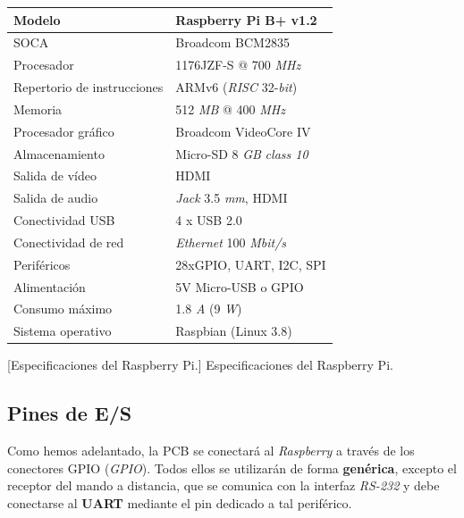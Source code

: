 \begin{center}
	\begin{tabular}{|l|l|}
		\hline Modelo & Raspberry Pi B+ v1.2 \\
		\hline \acrshort{SOCA} & Broadcom BCM2835 \\
		\hline Procesador &  1176JZF-S @ 700 \textit{MHz} \\
		\hline Repertorio de instrucciones & ARMv6 (\textit{RISC} 32-\textit{bit}) \\
		\hline Memoria & 512 \textit{MB} @ 400 \textit{MHz} \\
		\hline Procesador gráfico & Broadcom VideoCore IV \\ 		
		\hline Almacenamiento & Micro-\acrshort{SD} 8 \textit{GB} \textit{class 10} \\
		\hline Salida de vídeo & \acrshort{HDMI} \\
		\hline Salida de audio & \textit{Jack} 3.5 \textit{mm}, \acrshort{HDMI} \\
		\hline Conectividad USB & 4 x \acrshort{USB} 2.0 \\
		\hline Conectividad de red & \textit{Ethernet} 100 \textit{Mbit/s} \\
		\hline Periféricos & 28xGPIO, \acrshort{UART}, \acrshort{I2C}, \acrshort{SPI} \\ 
		\hline Alimentación & 5V Micro-\acrshort{USB} o \acrshort{GPIO} \\
		\hline Consumo máximo & 1.8 \textit{A} (9 \textit{W}) \\ 
		\hline Sistema operativo & Raspbian (Linux 3.8) \\
		\hline 
	\end{tabular}
	\smallskip
	[Especificaciones del Raspberry Pi.]{\label{tab:rapberry} Especificaciones del Raspberry Pi. \cite{raspberry}}

\end{center}

\smallskip

\subsection{Pines de E/S}

Como hemos adelantado, la \acrshort{PCB} se conectará al \textit{Raspberry} a través de los conectores \acrshort{GPIO} (\textit{\acrlong{GPIO}}). Todos ellos se utilizarán de forma \textbf{genérica}, excepto el receptor del mando a distancia, que se comunica con la interfaz \textit{RS-232} y debe conectarse al \textbf{\acrshort{UART}} mediante el pin dedicado a tal periférico.

